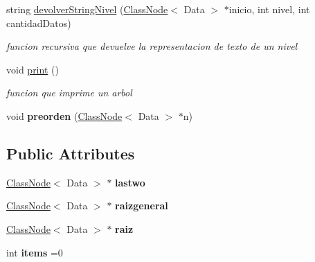\begin{DoxyCompactItemize}
string \hyperlink{class_binary_search_tree_a30a79ed298da4d6fe4395dddd53842b8}{devolver\+String\+Nivel} (\hyperlink{class_class_node}{Class\+Node}$<$ Data $>$ $\ast$inicio, int nivel, int cantidad\+Datos)
\begin{DoxyCompactList}\small\item\em funcion recursiva que devuelve la representacion de texto de un nivel \end{DoxyCompactList}\item 
\mbox{\label{class_binary_search_tree_af6e24d171e86e3c3a9092dbb822e4411}} 
void \hyperlink{class_binary_search_tree_af6e24d171e86e3c3a9092dbb822e4411}{print} ()
\begin{DoxyCompactList}\small\item\em funcion que imprime un arbol \end{DoxyCompactList}\item 
\mbox{\label{class_binary_search_tree_ad1ef774f107b357863b1b578d0723553}} 
void {\bfseries preorden} (\hyperlink{class_class_node}{Class\+Node}$<$ Data $>$ $\ast$n)
\end{DoxyCompactItemize}
\subsection*{Public Attributes}
\begin{DoxyCompactItemize}
\item 
\mbox{\label{class_binary_search_tree_a03b6a961580af63ef22085b6f421c639}} 
\hyperlink{class_class_node}{Class\+Node}$<$ Data $>$ $\ast$ {\bfseries lastwo}
\item 
\mbox{\label{class_binary_search_tree_a16ae9eac3a2653c15ec2bfb64172f8d0}} 
\hyperlink{class_class_node}{Class\+Node}$<$ Data $>$ $\ast$ {\bfseries raizgeneral}
\item 
\mbox{\label{class_binary_search_tree_a15180798e7105d7ec936e5741628c156}} 
\hyperlink{class_class_node}{Class\+Node}$<$ Data $>$ $\ast$ {\bfseries raiz}
\item 
\mbox{\label{class_binary_search_tree_a187988de7db6639f0541d59ef27e8ab6}} 
int {\bfseries items} =0
\end{DoxyCompactItemize}


